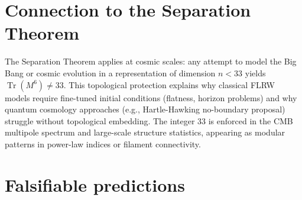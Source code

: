 \documentclass[19pt]{book}
\theoremstyle{plain}
\theoremstyle{definition}
\theoremstyle{remark}
\begin{document}
\section{Connection to the Separation Theorem}

The Separation Theorem applies at cosmic scales: any attempt to model the Big Bang or cosmic evolution in a representation of dimension \(n < 33\) yields \(\operatorname{Tr}(M^6) \neq 33\). This topological protection explains why classical FLRW models require fine-tuned initial conditions (flatness, horizon problems) and why quantum cosmology approaches (e.g., Hartle-Hawking no-boundary proposal) struggle without topological embedding. The integer 33 is enforced in the CMB multipole spectrum and large-scale structure statistics, appearing as modular patterns in power-law indices or filament connectivity.

\section{Falsifiable predictions}
\end{document}
